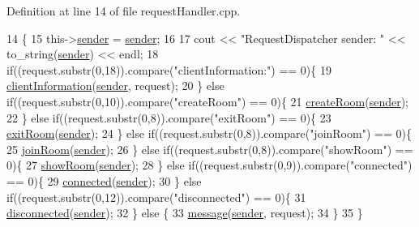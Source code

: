 Definition at line 14 of file request\+Handler.\+cpp.


\begin{DoxyCode}
14                                                                 \{
15     this->\hyperlink{class_request_handler_a6323c8ad9911e4872973360dc83d87ea}{sender} = \hyperlink{class_request_handler_a6323c8ad9911e4872973360dc83d87ea}{sender};
16 
17     cout << \textcolor{stringliteral}{"RequestDispatcher sender: "} << to\_string(\hyperlink{class_request_handler_a6323c8ad9911e4872973360dc83d87ea}{sender}) << endl;
18     \textcolor{keywordflow}{if}((request.substr(0,18)).compare(\textcolor{stringliteral}{"clientInformation:"}) == 0)\{
19         \hyperlink{class_request_handler_a1d0e08b23da9fc32799770d4a54dfc19}{clientInformation}(\hyperlink{class_request_handler_a6323c8ad9911e4872973360dc83d87ea}{sender}, request);
20     \} \textcolor{keywordflow}{else} \textcolor{keywordflow}{if}((request.substr(0,10)).compare(\textcolor{stringliteral}{"createRoom"}) == 0)\{
21         \hyperlink{class_request_handler_a760cd6fc41cc7f490c1d32ec81f82d5d}{createRoom}(\hyperlink{class_request_handler_a6323c8ad9911e4872973360dc83d87ea}{sender});
22     \} \textcolor{keywordflow}{else} \textcolor{keywordflow}{if}((request.substr(0,8)).compare(\textcolor{stringliteral}{"exitRoom"}) == 0)\{
23         \hyperlink{class_request_handler_abaea528a55051c351eb29e95a4826b33}{exitRoom}(\hyperlink{class_request_handler_a6323c8ad9911e4872973360dc83d87ea}{sender});
24     \} \textcolor{keywordflow}{else} \textcolor{keywordflow}{if}((request.substr(0,8)).compare(\textcolor{stringliteral}{"joinRoom"}) == 0)\{
25         \hyperlink{class_request_handler_a202db33f029e005e3c5eba9ef7c8556b}{joinRoom}(\hyperlink{class_request_handler_a6323c8ad9911e4872973360dc83d87ea}{sender});
26     \} \textcolor{keywordflow}{else} \textcolor{keywordflow}{if}((request.substr(0,8)).compare(\textcolor{stringliteral}{"showRoom"}) == 0)\{
27         \hyperlink{class_request_handler_a46d7477e46fad683391de05b86427ad8}{showRoom}(\hyperlink{class_request_handler_a6323c8ad9911e4872973360dc83d87ea}{sender});
28     \} \textcolor{keywordflow}{else} \textcolor{keywordflow}{if}((request.substr(0,9)).compare(\textcolor{stringliteral}{"connected"}) == 0)\{
29         \hyperlink{class_request_handler_a094d07998fe012848b608e962891f60f}{connected}(\hyperlink{class_request_handler_a6323c8ad9911e4872973360dc83d87ea}{sender});
30     \} \textcolor{keywordflow}{else} \textcolor{keywordflow}{if}((request.substr(0,12)).compare(\textcolor{stringliteral}{"disconnected"}) == 0)\{
31         \hyperlink{class_request_handler_ac017e06204f80a122cfa537b99fcba42}{disconnected}(\hyperlink{class_request_handler_a6323c8ad9911e4872973360dc83d87ea}{sender});
32     \} \textcolor{keywordflow}{else} \{
33         \hyperlink{class_request_handler_a41f02a201ac3fd366db9f51ee90814b3}{message}(\hyperlink{class_request_handler_a6323c8ad9911e4872973360dc83d87ea}{sender}, request);
34     \}
35 \}
\end{DoxyCode}


